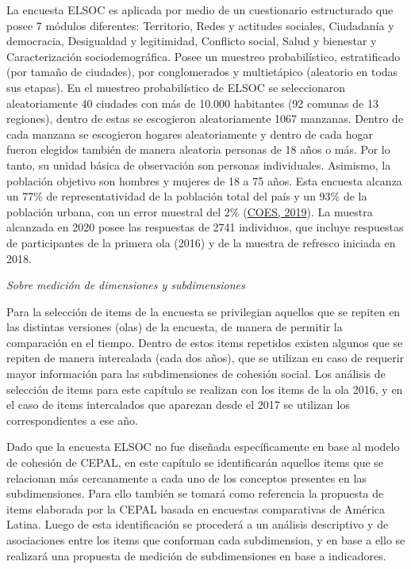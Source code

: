 \documentclass[
  12pt,
]{book}
\begin{document}
La encuesta ELSOC es aplicada por medio de un cuestionario estructurado que posee 7 módulos diferentes: Territorio, Redes y actitudes sociales, Ciudadanía y democracia, Desigualdad y legitimidad, Conflicto social, Salud y bienestar y Caracterización sociodemográfica. Posee un muestreo probabilístico, estratificado (por tamaño de ciudades), por conglomerados y multietápico (aleatorio en todas sus etapas). En el muestreo probabilístico de ELSOC se seleccionaron aleatoriamente 40 ciudades con más de 10.000 habitantes (92 comunas de 13 regiones), dentro de estas se escogieron aleatoriamente 1067 manzanas. Dentro de cada manzana se escogieron hogares aleatoriamente y dentro de cada hogar fueron elegidos también de manera aleatoria personas de 18 años o más. Por lo tanto, su unidad básica de observación son personas individuales. Asimismo, la población objetivo son hombres y mujeres de 18 a 75 años. Esta encuesta alcanza un 77\% de representatividad de la población total del país y un 93\% de la población urbana, con un error muestral del 2\% (\protect\hyperlink{ref-coes_radiografia_2019}{COES, 2019}). La muestra alcanzada en 2020 posee las respuestas de 2741 individuos, que incluye respuestas de participantes de la primera ola (2016) y de la muestra de refresco iniciada en 2018.

\emph{Sobre medición de dimensiones y subdimensiones}

Para la selección de items de la encuesta se privilegian aquellos que se repiten en las distintas versiones (olas) de la encuesta, de manera de permitir la comparación en el tiempo. Dentro de estos items repetidos existen algunos que se repiten de manera intercalada (cada dos años), que se utilizan en caso de requerir mayor información para las subdimensiones de cohesión social. Los análisis de selección de items para este capítulo se realizan con los items de la ola 2016, y en el caso de items intercalados que aparezan desde el 2017 se utilizan los correspondientes a ese año.

Dado que la encuesta ELSOC no fue diseñada específicamente en base al modelo de cohesión de CEPAL, en este capítulo se identificarán aquellos items que se relacionan más cercanamente a cada uno de los conceptos presentes en las subdimensiones. Para ello también se tomará como referencia la propuesta de items elaborada por la CEPAL basada en encuestas comparativas de América Latina. Luego de esta identificación se procederá a un análisis descriptivo y de asociaciones entre los items que conforman cada subdimension, y en base a ello se realizará una propuesta de medición de subdimensiones en base a indicadores.
\end{document}
